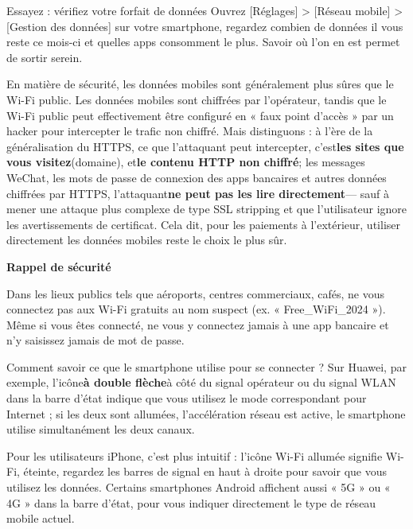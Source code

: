 \begin{tcbpractice}{Essayez : vérifiez votre forfait de données}
Ouvrez [Réglages] > [Réseau mobile] > [Gestion des données] sur votre smartphone, regardez combien de données il vous reste ce mois-ci et quelles apps consomment le plus. Savoir où l'on en est permet de sortir serein.

\end{tcbpractice}


En matière de sécurité, les données mobiles sont généralement plus sûres que le Wi-Fi public. Les données mobiles sont chiffrées par l'opérateur, tandis que le Wi-Fi public peut effectivement être configuré en « faux point d'accès » par un hacker pour intercepter le trafic non chiffré. Mais distinguons : à l'ère de la généralisation du HTTPS, ce que l'attaquant peut intercepter, c'est\textbf{les sites que vous visitez}(domaine), et\textbf{le contenu HTTP non chiffré}; les messages WeChat, les mots de passe de connexion des apps bancaires et autres données chiffrées par HTTPS, l'attaquant\textbf{ne peut pas les lire directement}— sauf à mener une attaque plus complexe de type SSL stripping et que l'utilisateur ignore les avertissements de certificat. Cela dit, pour les paiements à l'extérieur, utiliser directement les données mobiles reste le choix le plus sûr.

\textbf{Rappel de sécurité}\par

Dans les lieux publics tels que aéroports, centres commerciaux, cafés, ne vous connectez pas aux Wi-Fi gratuits au nom suspect (ex. « Free\_WiFi\_2024 »). Même si vous êtes connecté, ne vous y connectez jamais à une app bancaire et n'y saisissez jamais de mot de passe.


Comment savoir ce que le smartphone utilise pour se connecter ? Sur Huawei, par exemple, l'icône\textbf{à double flèche}à côté du signal opérateur ou du signal WLAN dans la barre d'état indique que vous utilisez le mode correspondant pour Internet ; si les deux sont allumées, l'accélération réseau est active, le smartphone utilise simultanément les deux canaux.

Pour les utilisateurs iPhone, c'est plus intuitif : l'icône Wi-Fi allumée signifie Wi-Fi, éteinte, regardez les barres de signal en haut à droite pour savoir que vous utilisez les données. Certains smartphones Android affichent aussi « 5G » ou « 4G » dans la barre d'état, pour vous indiquer directement le type de réseau mobile actuel.


